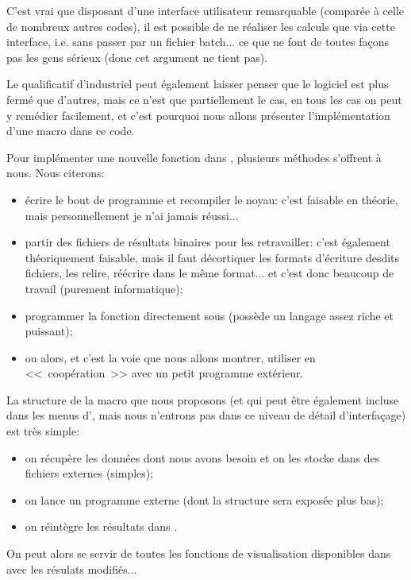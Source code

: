 C'est vrai que disposant d'une interface utilisateur remarquable (comparée à celle de nombreux autres codes),
il est possible de ne réaliser les calculs que via cette interface, i.e. sans passer par un fichier batch... ce que ne
font de toutes façons pas les gens sérieux (donc cet argument ne tient pas).

Le qualificatif d'industriel peut également laisser penser que le logiciel est plus fermé que d'autres, mais ce
n'est que partiellement le cas, en tous les cas on peut y remédier facilement, et c'est pourquoi nous allons
présenter l'implémentation d'une macro dans ce code.

\medskip
Pour implémenter une nouvelle fonction dans \ansys, plusieurs méthodes s'offrent à nous. Nous citerons:
\begin{itemize}
   \item écrire le bout de programme et recompiler le noyau: c'est faisable en théorie, mais personnellement je n'ai
	jamais réussi...
   \item partir des fichiers de résultats binaires pour les retravailler: c'est également théoriquement faisable, mais
	il faut décortiquer les formats d'écriture desdits fichiers, les relire, réécrire dans le même format...
	et c'est donc beaucoup de travail (purement informatique);
   \item programmer la fonction directement sous \ansys (\ansys possède un langage assez riche et puissant);
   \item ou alors, et c'est la voie que nous allons montrer, utiliser \ansys en <<~coopération~>> avec un
	petit programme extérieur.
\end{itemize}

\medskip
La structure de la macro \ansys que nous proposons (et qui peut être également incluse dans les menus d'\ansys, mais
nous n'entrons pas dans ce niveau de détail d'interfaçage) est très simple:
\begin{itemize}
   \item on récupère les données dont nous avons besoin et on les stocke dans des fichiers externes (simples);
   \item on lance un programme externe (dont la structure sera exposée plus bas);
   \item on réintègre les résultats dans \ansys.
\end{itemize}
On peut alors se servir de toutes les fonctions de visualisation disponibles dans \ansys avec les résulats modifiés...

